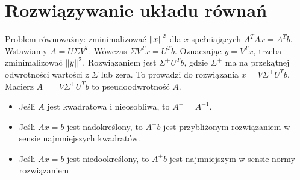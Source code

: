 \section{Rozwiązywanie układu równań}
Problem równoważny: zminimalizować \( \left\Vert x \right\Vert^2 \) dla \( x \) spełniających \( A^TAx = A^Tb \). \\
Wstawiamy \( A = U\Sigma V^T \). Wówczas \( \Sigma V^Tx = U^Tb \). Oznaczając \( y = V^Tx \), trzeba zminimalizować \( \left\Vert y \right\Vert^2 \). Rozwiązaniem jest \( \Sigma^+U^Tb \), gdzie \( \Sigma^+ \) ma na przekątnej odwrotności wartości z \( \Sigma \) lub zera. To prowadzi do rozwiązania \( x = V\Sigma^+U^Tb \). Macierz \( A^+ = V\Sigma^+U^Tb \) to pseudoodwrotność \( A \).
\begin{itemize}
\onehalfspacing
    \item Jeśli \( A \) jest kwadratowa i nieosobliwa, to \( A^+ = A^{-1} \).
    \item Jeśli \( Ax = b \) jest nadokreślony, to \( A^+b \) jest przybliżonym rozwiązaniem w sensie najmniejszych kwadratów.
    \item Jeśli \( Ax = b \) jest niedookreślony, to \( A^+b \) jest najmniejszym w sensie normy rozwiązaniem
\end{itemize}